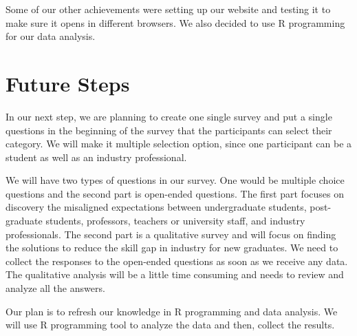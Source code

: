 \documentclass{sigchi}
\begin{document}
Some of our other achievements were setting up our website and testing it to make sure it opens in different browsers. We also decided to use R programming for our data analysis.

 \section{Future Steps}
In our next step, we are planning to create one single survey and put a single questions in the beginning of the survey that the participants can select their category. We will make it multiple selection option, since one participant can be a student as well as an industry professional.

We will have two types of questions in our survey. One would be multiple choice questions and the second part is open-ended questions. The first part focuses on discovery the misaligned expectations between undergraduate students, post-graduate students, professors, teachers or university staff, and industry professionals. The second part is a qualitative survey and will focus on finding the solutions to reduce the skill gap in industry for new graduates. We need to collect the responses to the open-ended questions as soon as we receive any data. The qualitative analysis will be a little time consuming and needs to review and analyze all the answers.

Our plan is to refresh our knowledge in R programming and data analysis. We will use R programming tool to analyze the data and then, collect the results.
 

\balance{}

\balance{}



\end{document}
